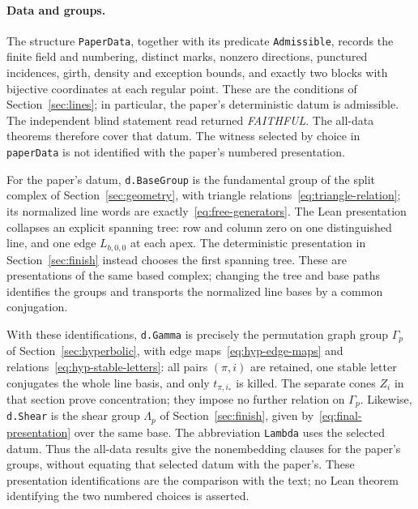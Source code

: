 \paragraph{Data and groups.}
The structure \texttt{PaperData}, together with its predicate
\texttt{Admissible}, records the finite field and numbering, distinct
marks, nonzero directions, punctured incidences, girth, density and
exception bounds, and exactly two blocks with bijective coordinates at
each regular point. These are the conditions of
Section~\ref{sec:lines}; in particular, the paper's deterministic datum
is admissible. The independent blind statement read returned
\emph{FAITHFUL}. The all-data theorems therefore cover that datum.
The witness selected by choice in \texttt{paperData} is not identified
with the paper's numbered presentation.

For the paper's datum, \texttt{d.BaseGroup} is the fundamental group of
the split complex of Section~\ref{sec:geometry}, with triangle
relations~\eqref{eq:triangle-relation}; its normalized line words are
exactly~\eqref{eq:free-generators}. The Lean presentation collapses an
explicit spanning tree: row and column zero on one distinguished line,
and one edge \(L_{b,0,0}\) at each apex. The deterministic presentation
in Section~\ref{sec:finish} instead chooses the first spanning tree.
These are presentations of the same based complex; changing the tree
and base paths identifies the groups and transports the normalized
line bases by a common conjugation.

With these identifications, \texttt{d.Gamma} is precisely the
permutation graph group \(\Gamma_p\) of Section~\ref{sec:hyperbolic},
with edge maps~\eqref{eq:hyp-edge-maps} and
relations~\eqref{eq:hyp-stable-letters}: all pairs \((\pi,i)\) are
retained, one stable letter conjugates the whole line basis, and only
\(t_{\pi,i_*}\) is killed. The separate cones \(Z_i\) in that section
prove concentration; they impose no further relation on \(\Gamma_p\).
Likewise, \texttt{d.Shear} is the shear group \(\Lambda_p\) of
Section~\ref{sec:finish}, given by~\eqref{eq:final-presentation} over
the same base. The abbreviation \texttt{Lambda} uses the selected
datum. Thus the all-data results give the nonembedding clauses for the
paper's groups, without equating that selected datum with the paper's.
These presentation identifications are the comparison with the text;
no Lean theorem identifying the two numbered choices is asserted.


